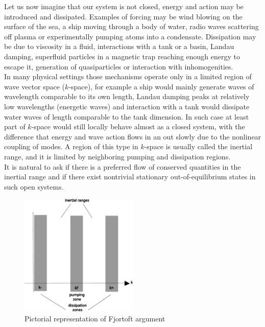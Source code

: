 Let us now imagine that our system is not closed, energy and action may be introduced and dissipated. Examples of forcing may be wind blowing on the surface of the sea, 
a ship moving through a body of water, radio waves scattering off plasma or experimentally pumping atoms into a condensate. Dissipation may be due to viscosity in a fluid,
interactions with a tank or a basin, Landau damping, superfluid particles in a magnetic trap reaching enough energy to escape it, generation of quasiparticles or interaction 
with inhomogenities.\\
In many physical settings those mechanisms operate only in a limited region of wave vector space ($k$-space), for example a ship would mainly generate waves of wavelength comparable to 
its own length, Landau damping peaks at relatively low wavelengths (energetic waves) and interaction with a tank would dissipate water waves of length comparable to the tank dimension. In such 
case at least part of  $k$-space would still locally behave almost as a closed system, with the difference that energy and wave action flows in an out slowly due to the nonlinear 
coupling of modes. A region of this type in $k$-space is usually called the inertial range, and it is limited by neighboring pumping and dissipation regions.\\
It is natural to ask if there is a preferred flow of conserved quantities in the inertial range and if there exist nontrivial stationary out-of-equilibrium 
states in such open systems. \\
\begin{figure} %
    \centering
    \includegraphics[width=0.5\textwidth]{images/Fjortoft.pdf}
    \caption{Pictorial representation of Fjortoft argument}
\end{figure}

